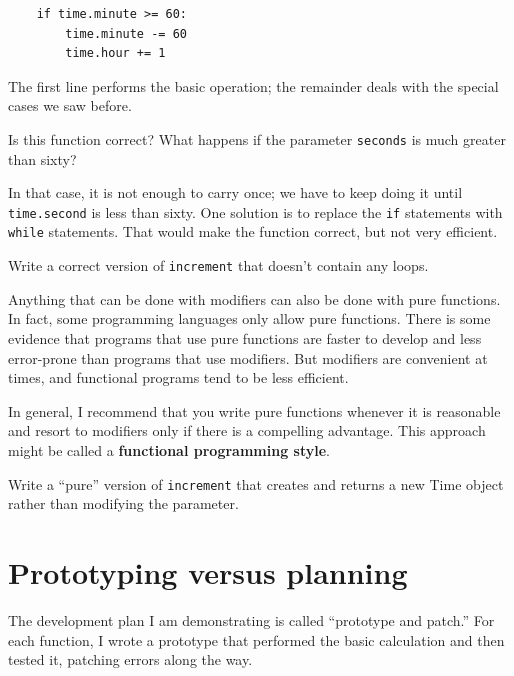 \documentclass[10pt]{book}
\begin{document}
\begin{CJK}{UTF8}{gbsn}
\begin{verbatim}
    if time.minute >= 60:
        time.minute -= 60
        time.hour += 1
\end{verbatim}
%
The first line performs the basic operation; the remainder deals
with the special cases we saw before.

Is this function correct?  What happens if the parameter {\tt seconds}
is much greater than sixty?  

In that case, it is not enough to carry
once; we have to keep doing it until {\tt time.second} is less than sixty.
One solution is to replace the {\tt if} statements with {\tt while}
statements.  That would make the function correct, but not
very efficient.

\begin{exercise}

Write a correct version of {\tt increment} that
doesn't contain any loops.

\end{exercise}

Anything that can be done with modifiers can also be done with pure
functions.  In fact, some programming languages only allow pure
functions.  There is some evidence that programs that use pure
functions are faster to develop and less error-prone than programs
that use modifiers.  But modifiers are convenient at times,
and functional programs tend to be less efficient.

In general, I recommend that you write pure functions whenever it is
reasonable and resort to modifiers only if there is a compelling
advantage.  This approach might be called a {\bf functional
programming style}.


\begin{exercise}

Write a ``pure'' version of {\tt increment} that creates and returns
a new Time object rather than modifying the parameter.

\end{exercise}


\section{Prototyping versus planning}
\label{prototype}

The development plan I am demonstrating is called ``prototype and
patch.''  For each function, I wrote a prototype that performed the
basic calculation and then tested it, patching errors along the
way.


\end{CJK}
\end{document}
